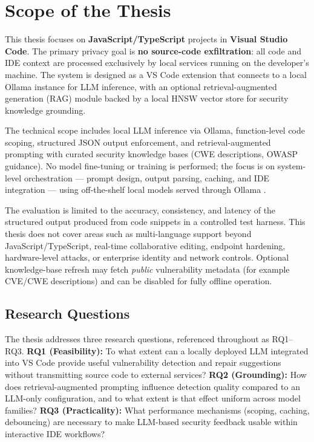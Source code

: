 \section{Scope of the Thesis}
\label{sec:intro-scope}

This thesis focuses on \textbf{JavaScript/TypeScript} projects in \textbf{Visual Studio Code}. The primary privacy goal is \textbf{no source-code exfiltration}: all code and IDE context are processed exclusively by local services running on the developer's machine. The system is designed as a VS Code extension that connects to a local Ollama instance for LLM inference, with an optional retrieval-augmented generation (RAG) module backed by a local HNSW vector store for security knowledge grounding.

The technical scope includes local LLM inference via Ollama, function-level code scoping, structured JSON output enforcement, and retrieval-augmented prompting with curated security knowledge bases (CWE descriptions, OWASP guidance). No model fine-tuning or training is performed; the focus is on system-level orchestration --- prompt design, output parsing, caching, and IDE integration --- using off-the-shelf local models served through Ollama \cite{ollamaDocs}.

The evaluation is limited to the accuracy, consistency, and latency of the structured output produced from code snippets in a controlled test harness. This thesis does not cover areas such as multi-language support beyond JavaScript/TypeScript, real-time collaborative editing, endpoint hardening, hardware-level attacks, or enterprise identity and network controls. Optional knowledge-base refresh may fetch \emph{public} vulnerability metadata (for example CVE/CWE descriptions) and can be disabled for fully offline operation.

\subsection{Research Questions}
\label{sec:intro-rqs}

The thesis addresses three research questions, referenced throughout as RQ1--RQ3. \textbf{RQ1 (Feasibility):} To what extent can a locally deployed LLM integrated into VS Code provide useful vulnerability detection and repair suggestions without transmitting source code to external services? \textbf{RQ2 (Grounding):} How does retrieval-augmented prompting influence detection quality compared to an LLM-only configuration, and to what extent is that effect uniform across model families? \textbf{RQ3 (Practicality):} What performance mechanisms (scoping, caching, debouncing) are necessary to make LLM-based security feedback usable within interactive IDE workflows?

